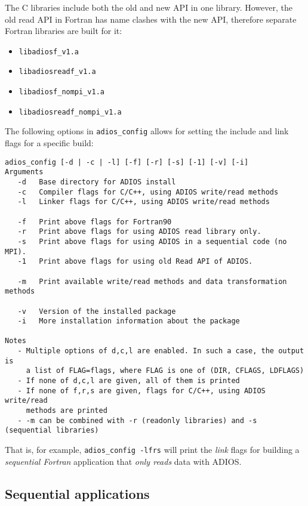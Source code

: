 The C libraries include both the old and new API in one library. However, the old read API in Fortran has name clashes with the new API, therefore separate Fortran libraries are built for it:

\begin{itemize}
\item \verb+libadiosf_v1.a           +
\item \verb+libadiosreadf_v1.a       +
\item \verb+libadiosf_nompi_v1.a     +
\item \verb+libadiosreadf_nompi_v1.a +
\end{itemize}

The following options in \verb+adios_config+ allows for setting the include and link flags for a specific build:

\begin{lstlisting}
adios_config [-d | -c | -l] [-f] [-r] [-s] [-1] [-v] [-i]
Arguments
   -d   Base directory for ADIOS install
   -c   Compiler flags for C/C++, using ADIOS write/read methods
   -l   Linker flags for C/C++, using ADIOS write/read methods

   -f   Print above flags for Fortran90
   -r   Print above flags for using ADIOS read library only.
   -s   Print above flags for using ADIOS in a sequential code (no MPI).
   -1   Print above flags for using old Read API of ADIOS.

   -m   Print available write/read methods and data transformation methods

   -v   Version of the installed package
   -i   More installation information about the package

Notes
   - Multiple options of d,c,l are enabled. In such a case, the output is
     a list of FLAG=flags, where FLAG is one of (DIR, CFLAGS, LDFLAGS)
   - If none of d,c,l are given, all of them is printed
   - If none of f,r,s are given, flags for C/C++, using ADIOS write/read
     methods are printed
   - -m can be combined with -r (readonly libraries) and -s (sequential libraries)
\end{lstlisting}

That is, for example, \verb+adios_config -lfrs+ will print the \emph{link} flags for building
a \emph{sequential Fortran} application that \emph{only reads} data with ADIOS.

\subsection{Sequential applications}

